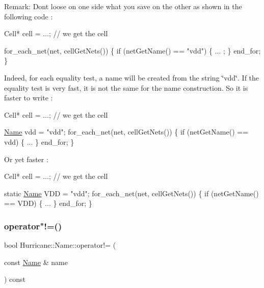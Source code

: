 \begin{DoxyParagraph}{Remark\+:}
Don\textquotesingle{}t loose on one side what you save on the other as shown in the following code \+: 
\begin{DoxyCode}
Cell* cell = ...; \textcolor{comment}{// we get the cell}
 
for\_each\_net(net, cellGetNets()) \{
   \textcolor{keywordflow}{if} (netGetName() == \textcolor{stringliteral}{"vdd"}) \{
      ... ;
   \}
   end\_for;
\}
\end{DoxyCode}
 Indeed, for each equality test, a name will be created from the string \char`\"{}vdd\char`\"{}. If the equality test is very fast, it is not the same for the name construction. So it is faster to write \+: 
\begin{DoxyCode}
Cell* cell = ...; \textcolor{comment}{// we get the cell}
 
\hyperlink{classHurricane_1_1Name_a42636ecb0d4d7d03eb881420a244038b}{Name} vdd = \textcolor{stringliteral}{"vdd"};
for\_each\_net(net, cellGetNets()) \{
   \textcolor{keywordflow}{if} (netGetName() == vdd) \{
      ...
   \}
   end\_for;
\}
\end{DoxyCode}
 Or yet faster \+: 
\begin{DoxyCode}
Cell* cell = ...; \textcolor{comment}{// we get the cell}
 
\textcolor{keyword}{static} \hyperlink{classHurricane_1_1Name_a42636ecb0d4d7d03eb881420a244038b}{Name} VDD = \textcolor{stringliteral}{"vdd"};
for\_each\_net(net, cellGetNets()) \{
   \textcolor{keywordflow}{if} (netGetName() == VDD) \{
      ...
   \}
   end\_for;
\}
\end{DoxyCode}
 
\end{DoxyParagraph}
\mbox{\label{classHurricane_1_1Name_aff97f0bcf698ad76f6f3c9a4c4833cc3}} 
\subsubsection{\texorpdfstring{operator"!=()}{operator!=()}}
{\footnotesize\ttfamily bool Hurricane\+::\+Name\+::operator!= (\begin{DoxyParamCaption}\item[{const \hyperlink{classHurricane_1_1Name}{Name} \&}]{name }\end{DoxyParamCaption}) const}

